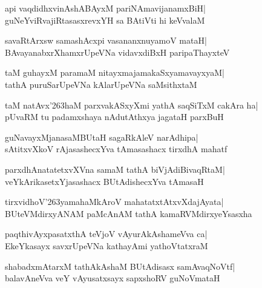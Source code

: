 \documentclass[twoside,12pt,openright]{book}
\def\S{\char'263}
\newcounter{shloka}[chapter]
\begin{document}
\begin{shloka}%
api vaqdidhxvinAshABAyxM pariNAmavijanamxBiH|\\
guNeYviRvajiRtasasxrevxYH sa BAtiVti hi keVvalaM
\end{shloka}

\begin{shloka}%
savaRtArxsw samashAcxpi vasananxnuyamoV mataH|\\
BAvayanabxrXhamxrUpeVNa vidavxdiBxH paripaThayxteV
\end{shloka}

\begin{shloka}%
taM guhayxM paramaM nitayxmajamakaSxyamavayxyaM|\\
tathA puruSarUpeVNa kAlarUpeVNa saMsithxtaM
\end{shloka}

\begin{shloka}%
taM natAvx\S haM parxvakASxyXmi yathA saqSiTxM cakAra ha|\\
pUvaRM tu padamxshaya nAdutAthxya jagataH parxBuH
\end{shloka}

\begin{shloka}%
guNavayxMjanasaMBUtaH sagaRkAleV narAdhipa|\\
sAtitxvXkoV rAjasashecxYva tAmasashacx tirxdhA mahatf
\end{shloka}

\begin{shloka}%
parxdhAnatatetxvXVna samaM tathA biVjAdiBivaqRtaM|\\
veYkArikasetxYjasashacx BUtAdishecxYva tAmasaH
\end{shloka}

\begin{shloka}%
tirxvidhoV\S yamahaMkAroV mahatatxtAtxvXdajAyata|\\
BUteVMdirxyANAM paMcAnAM tathA kamaRVMdirxyeYsasxha
\end{shloka}

\begin{shloka}%
paqthivAyxpasatxthA teVjoV vAyurAkAshameVva ca|\\
EkeYkasayx savxrUpeVNa kathayAmi yathoVtatxraM
\end{shloka}

\begin{shloka}%
shabadxmAtarxM tathAkAshaM BUtAdisasx samAvaqNoVtf|\\
balavAneVva veY vAyusatxsayx sapxshoRV guNoVmataH
\end{shloka}
\end{document}
